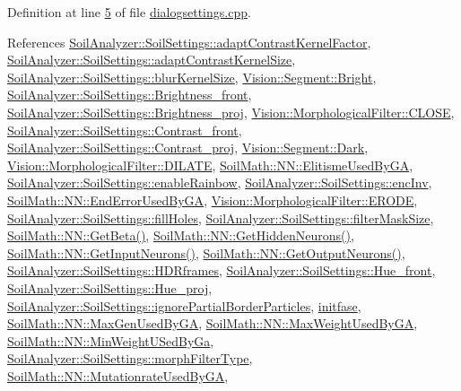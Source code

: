 Definition at line \hyperlink{dialogsettings_8cpp_source_l00005}{5} of file \hyperlink{dialogsettings_8cpp_source}{dialogsettings.\+cpp}.



References \hyperlink{soilsettings_8h_source_l00044}{Soil\+Analyzer\+::\+Soil\+Settings\+::adapt\+Contrast\+Kernel\+Factor}, \hyperlink{soilsettings_8h_source_l00042}{Soil\+Analyzer\+::\+Soil\+Settings\+::adapt\+Contrast\+Kernel\+Size}, \hyperlink{soilsettings_8h_source_l00049}{Soil\+Analyzer\+::\+Soil\+Settings\+::blur\+Kernel\+Size}, \hyperlink{_segment_8h_source_l00059}{Vision\+::\+Segment\+::\+Bright}, \hyperlink{soilsettings_8h_source_l00075}{Soil\+Analyzer\+::\+Soil\+Settings\+::\+Brightness\+\_\+front}, \hyperlink{soilsettings_8h_source_l00076}{Soil\+Analyzer\+::\+Soil\+Settings\+::\+Brightness\+\_\+proj}, \hyperlink{_morphological_filter_8h_source_l00016}{Vision\+::\+Morphological\+Filter\+::\+C\+L\+O\+S\+E}, \hyperlink{soilsettings_8h_source_l00077}{Soil\+Analyzer\+::\+Soil\+Settings\+::\+Contrast\+\_\+front}, \hyperlink{soilsettings_8h_source_l00078}{Soil\+Analyzer\+::\+Soil\+Settings\+::\+Contrast\+\_\+proj}, \hyperlink{_segment_8h_source_l00060}{Vision\+::\+Segment\+::\+Dark}, \hyperlink{_morphological_filter_8h_source_l00016}{Vision\+::\+Morphological\+Filter\+::\+D\+I\+L\+A\+T\+E}, \hyperlink{_n_n_8h_source_l00135}{Soil\+Math\+::\+N\+N\+::\+Elitisme\+Used\+By\+G\+A}, \hyperlink{soilsettings_8h_source_l00070}{Soil\+Analyzer\+::\+Soil\+Settings\+::enable\+Rainbow}, \hyperlink{soilsettings_8h_source_l00069}{Soil\+Analyzer\+::\+Soil\+Settings\+::enc\+Inv}, \hyperlink{_n_n_8h_source_l00136}{Soil\+Math\+::\+N\+N\+::\+End\+Error\+Used\+By\+G\+A}, \hyperlink{_morphological_filter_8h_source_l00016}{Vision\+::\+Morphological\+Filter\+::\+E\+R\+O\+D\+E}, \hyperlink{soilsettings_8h_source_l00055}{Soil\+Analyzer\+::\+Soil\+Settings\+::fill\+Holes}, \hyperlink{soilsettings_8h_source_l00064}{Soil\+Analyzer\+::\+Soil\+Settings\+::filter\+Mask\+Size}, \hyperlink{_n_n_8h_source_l00102}{Soil\+Math\+::\+N\+N\+::\+Get\+Beta()}, \hyperlink{_n_n_8h_source_l00143}{Soil\+Math\+::\+N\+N\+::\+Get\+Hidden\+Neurons()}, \hyperlink{_n_n_8h_source_l00140}{Soil\+Math\+::\+N\+N\+::\+Get\+Input\+Neurons()}, \hyperlink{_n_n_8h_source_l00146}{Soil\+Math\+::\+N\+N\+::\+Get\+Output\+Neurons()}, \hyperlink{soilsettings_8h_source_l00066}{Soil\+Analyzer\+::\+Soil\+Settings\+::\+H\+D\+Rframes}, \hyperlink{soilsettings_8h_source_l00081}{Soil\+Analyzer\+::\+Soil\+Settings\+::\+Hue\+\_\+front}, \hyperlink{soilsettings_8h_source_l00082}{Soil\+Analyzer\+::\+Soil\+Settings\+::\+Hue\+\_\+proj}, \hyperlink{soilsettings_8h_source_l00053}{Soil\+Analyzer\+::\+Soil\+Settings\+::ignore\+Partial\+Border\+Particles}, \hyperlink{dialogsettings_8h_source_l00136}{initfase}, \hyperlink{_n_n_8h_source_l00132}{Soil\+Math\+::\+N\+N\+::\+Max\+Gen\+Used\+By\+G\+A}, \hyperlink{_n_n_8h_source_l00137}{Soil\+Math\+::\+N\+N\+::\+Max\+Weight\+Used\+By\+G\+A}, \hyperlink{_n_n_8h_source_l00138}{Soil\+Math\+::\+N\+N\+::\+Min\+Weight\+U\+Sed\+By\+Ga}, \hyperlink{soilsettings_8h_source_l00060}{Soil\+Analyzer\+::\+Soil\+Settings\+::morph\+Filter\+Type}, \hyperlink{_n_n_8h_source_l00134}{Soil\+Math\+::\+N\+N\+::\+Mutationrate\+Used\+By\+G\+A}, 